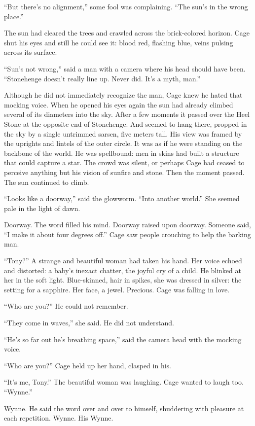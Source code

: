 “But there’s no alignment,” some fool was complaining. “The sun’s in the wrong place.”

The sun had cleared the trees and crawled across the brick-colored horizon. Cage shut his eyes and still he could see it: blood red, flashing blue, veins pulsing across its surface.

“Sun’s not wrong,” said a man with a camera where his head should have been. “Stonehenge doesn’t really line up. Never did. It’s a myth, man.”

Although he did not immediately recognize the man, Cage knew he hated that mocking voice. When he opened his eyes again the sun had already climbed several of its diameters into the sky. After a few moments it passed over the Heel Stone at the opposite end of Stonehenge. And seemed to hang there, propped in the sky by a single untrimmed sarsen, five meters tall. His view was framed by the uprights and lintels of the outer circle. It was as if he were standing on the backbone of the world. He was spellbound: men in skins had built a structure that could capture a star. The crowd was silent, or perhaps Cage had ceased to perceive anything but his vision of sunfire and stone. Then the moment passed. The sun continued to climb.

“Looks like a doorway,” said the glowworm. “Into another world.” She seemed pale in the light of dawn.

Doorway. The word filled his mind. Doorway raised upon doorway. Someone said, “I make it about four degrees off.” Cage saw people crouching to help the barking man.

“Tony?” A strange and beautiful woman had taken his hand. Her voice echoed and distorted: a baby’s inexact chatter, the joyful cry of a child. He blinked at her in the soft light. Blue-skinned, hair in spikes, she was dressed in silver: the setting for a sapphire. Her face, a jewel. Precious. Cage was falling in love.

“Who are you?” He could not remember.

“They come in waves,” she said. He did not understand.

“He’s so far out he’s breathing space,” said the camera head with the mocking voice.

“Who are you?” Cage held up her hand, clasped in his.

“It’s me, Tony.” The beautiful woman was laughing. Cage wanted to laugh too. “Wynne.”

Wynne. He said the word over and over to himself, shuddering with pleasure at each repetition. Wynne. His Wynne.

